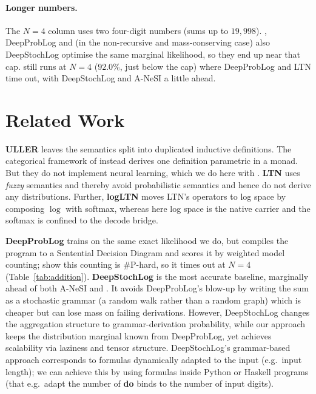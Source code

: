 \documentclass[anon]{../../journal-templates/NeSy26/nesy2026} %
\begin{document}
\paragraph{Longer numbers.} The $N{=}4$ column uses two four-digit numbers (sums up to $19{,}998$). \nesycattorch, DeepProbLog and (in the non-recursive and mass-conserving case) also DeepStochLog
optimise the same marginal likelihood, so they end up near that cap. \nesycattorch
still runs at $N{=}4$ ($92.0\%$, just below the cap) where DeepProbLog and LTN time out, with
DeepStochLog and A-NeSI a little ahead.

\section{Related Work}
\label{sec:related}

\textbf{ULLER} \citep{vankriekenULLER2024} leaves the
semantics split into duplicated inductive definitions. The categorical framework of
\citet{schellhornNeSyCatCategorical2026} instead derives one definition parametric in a monad. But they do not implement neural learning, which we do here with \textbf{\nesycattorch}. \textbf{LTN}
\citep{DBLP:journals/ai/BadreddineGSS22} uses \emph{fuzzy} semantics and thereby avoid probabilistic semantics and hence do not derive any distributions.
Further, \textbf{logLTN} \citep{badreddineLogLTN2023} moves LTN's operators to log space
by composing $\log$ with softmax, whereas here log space is the native carrier and the
softmax is confined to the decode bridge.

\textbf{DeepProbLog} \citep{DBLP:journals/ai/ManhaeveDKDR21} trains on the same exact likelihood we do,
but compiles the program to a Sentential Decision Diagram and scores it by weighted model counting;
\citet{kriekenANeSI2023} show this counting is \#P-hard, so it times out at $N{=}4$
(Table~\ref{tab:addition}). \textbf{DeepStochLog} \citep{wintersDeepStochLog2022}  is the most accurate baseline, marginally ahead of both A-NeSI and \nesycattorch. It
 avoids DeepProbLog's blow-up by writing the sum as a stochastic grammar (a random walk rather than a random graph) which is cheaper but can lose mass on failing derivations. However, DeepStochLog changes the aggregation structure to grammar-derivation probability, while our approach keeps the distribution marginal known from DeepProbLog, yet achieves scalability via laziness and tensor structure. DeepStochLog's grammar-based approach corresponds to formulas dynamically adapted to the input (e.g.\ input length); we can achieve this by using \nesycattorch formulas inside Python or Haskell programs (that e.g.\ adapt the number of \textbf{do} binds to the number of input digits).
\end{document}

